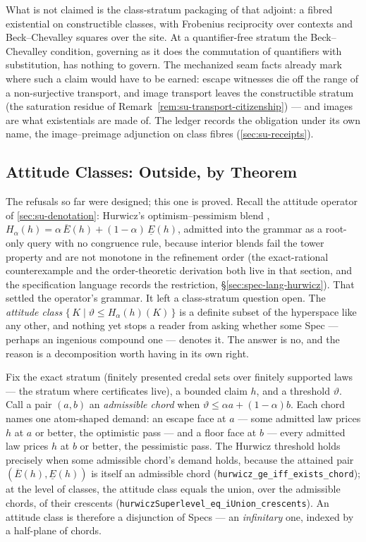 What is not claimed is the class-stratum packaging of that
adjoint: a fibred existential on constructible classes, with
Frobenius reciprocity over contexts and Beck--Chevalley squares
over the site. At a quantifier-free stratum the Beck--Chevalley
condition, governing as it does the commutation of quantifiers
with substitution, has nothing to govern. The mechanized seam
facts already mark where such a claim would have to be earned:
escape witnesses die off the range of a non-surjective transport,
and image transport leaves the constructible stratum (the
saturation residue of Remark~\ref{rem:su-transport-citizenship})
--- and images are what existentials are made of. The ledger
records the obligation under its own name, the image--preimage
adjunction on class fibres (\autoref{sec:su-receipts}).

\subsection{Attitude Classes: Outside, by Theorem}
\label{sec:su-attitude-classes}

The refusals so far were designed; this one is proved. Recall the
attitude operator of \autoref{sec:su-denotation}: Hurwicz's
optimism--pessimism blend \cite{hurwicz51},
$H_\alpha(h) = \alpha\, \overline{E}(h) + (1-\alpha)\,
\underline{E}(h)$, admitted into the grammar as a root-only query
with no congruence rule, because interior blends fail the tower
property and are not monotone in the refinement order (the
exact-rational counterexample and the order-theoretic derivation
both live in that section, and the specification language records
the restriction, \S\ref{sec:spec-lang-hurwicz}). That settled the
operator's grammar. It left a class-stratum question open. The
\emph{attitude class}
$\{\,K \mid \vartheta \le H_\alpha(h)(K)\,\}$ is a definite subset
of the hyperspace like any other, and nothing yet stops a reader
from asking whether some Spec --- perhaps an ingenious compound
one --- denotes it. The answer is no, and the reason is a
decomposition worth having in its own right.

Fix the exact stratum (finitely presented credal sets over
finitely supported laws --- the stratum where certificates live),
a bounded claim $h$, and a threshold $\vartheta$. Call a pair
$(a,b)$ an \emph{admissible chord} when
$\vartheta \le \alpha a + (1-\alpha) b$. Each chord names one
atom-shaped demand: an escape face at $a$ --- some admitted law
prices $h$ at $a$ or better, the optimistic pass --- and a floor
face at $b$ --- every admitted law prices $h$ at $b$ or better,
the pessimistic pass. The Hurwicz threshold holds precisely when
some admissible chord's demand holds, because the attained pair
$(\overline{E}(h), \underline{E}(h))$ is itself an admissible
chord (\texttt{hurwicz\_ge\_iff\_exists\_chord}); at the level of
classes, the attitude class equals the union, over the admissible
chords, of their crescents
(\texttt{hurwiczSuperlevel\_eq\_iUnion\_crescents}). An attitude
class is therefore a disjunction of Specs --- an \emph{infinitary}
one, indexed by a half-plane of chords.


